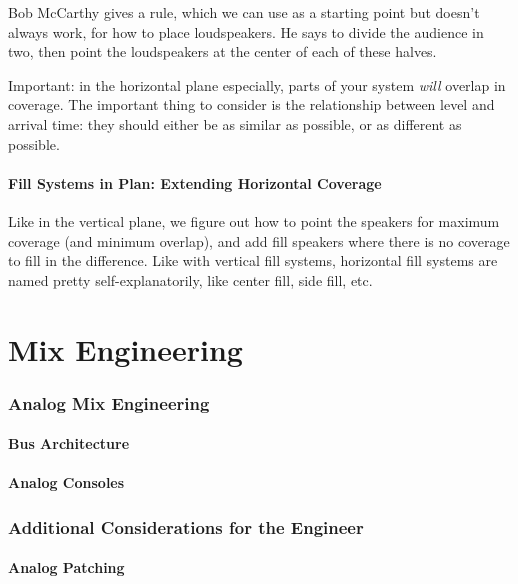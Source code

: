 \documentclass[a4paper]{article}
\begin{document}
Bob McCarthy gives a rule, which we can use as a starting point but doesn't
always work, for how to place loudspeakers. He says to divide the audience in
two, then point the loudspeakers at the center of each of these halves.

Important: in the horizontal plane especially, parts of your system \emph{will}
overlap in coverage. The important thing to consider is the relationship
between level and arrival time: they should either be as similar as possible,
or as different as possible.

\subsection{Fill Systems in Plan: Extending Horizontal Coverage}

Like in the vertical plane, we figure out how to point the speakers for maximum
coverage (and minimum overlap), and add fill speakers where there is no
coverage to fill in the difference. Like with vertical fill systems, horizontal
fill systems are named pretty self-explanatorily, like center fill, side fill,
etc.

\part{Mix Engineering}

\section{Analog Mix Engineering}

\subsection{Bus Architecture}

\subsection{Analog Consoles}

\section[Additional Considerations]{Additional Considerations for the Engineer}

\subsection{Analog Patching}
\end{document}
